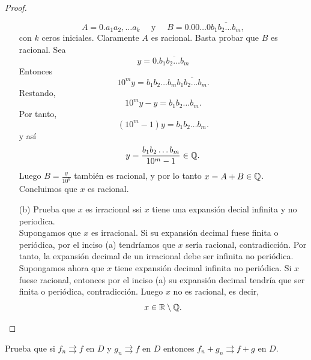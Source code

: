 \documentclass[12pt,a4paper]{article}
\begin{document}
\begin{proof}
\begin{enumerate}
\begin{equation*}
                A=0.a_{1}a_{2},\dots a_{k}\quad\text{ y }\quad B=0.00\dots0\overline{b_{1}b_{2}\dots b_{m}},
            \end{equation*}
            con $k$ ceros iniciales. Claramente $A$ es racional. Basta probar que $B$ es racional.
            Sea
            \begin{equation*}
                y=0.\overline{b_{1}b_{2}\dots b_{m}}
            \end{equation*}
            Entonces
            \begin{equation*}
                10^{m}y=b_{1}b_{2}\dots b_{m}\overline{b_{1}b_{2}\dots b_{m}}.
            \end{equation*}
            Restando,
            \begin{equation*}
                10^{m}y-y=b_{1}b_{2}\dots b_{m}.
            \end{equation*}
            Por tanto,
            \begin{equation*}
                (10^{m}-1)y=b_{1}b_{2}\dots b_{m}.
            \end{equation*}
            y así
            \begin{equation*}
                y=\frac{b_{1}b_{2}\dots b_{m}}{10^{m}-1}\in\Q.
            \end{equation*}
            Luego $B=\frac{y}{10^{k}}$ también es racional, y por lo tanto $x=A+B\in\Q$. Concluimos que
            $x$ es racional.
            \item[(b)] Prueba que $x$ es irracional ssi $x$ tiene una expansión decial infinita
            y no periodica.\\
            Supongamos que $x$ es irracional. Si su expansión decimal fuese finita o periódica, por
            el inciso (a) tendríamos que $x$ sería racional, contradicción. Por tanto, la expansión
            decimal de un irracional debe ser infinita no periódica. Supongamos ahora que $x$
            tiene expansión decimal infinita no periódica. Si $x$ fuese racional, entonces por el
            inciso (a) su expansión decimal tendría que ser finita o periódica, contradicción. Luego
            $x$ no es racional, es decir,
            \begin{equation*}
                x\in\mathbb{R}\setminus\mathbb{Q}.
            \end{equation*}
        \end{enumerate}
    \end{proof}

    \begin{mdframed}[style=mdpinkbox,frametitle={Ejercicio 5}]
        Prueba que si $f_{n}\rightrightarrows f$ en $D$ y $g_{n}\rightrightarrows f$ en $D$
        entonces $f_{n}+g_{n}\rightrightarrows f+g$ en $D$.
    \end{mdframed}
\end{document}
